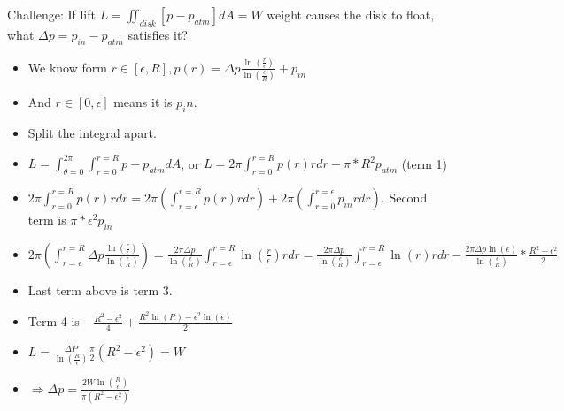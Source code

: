 \documentclass[11pt, oneside]{article}   	%
\begin{document}
Challenge: If lift $L = \iint_{disk} [p-p_{atm}]dA = W$ weight causes the disk to float, what $\Delta p = p_{in} - p_{atm}$ satisfies it?
\begin{itemize}
\item We know form $r \in [\epsilon, R], p(r) = \Delta p \frac
  {\ln(\frac{r}{\epsilon})}
  {\ln(\frac{\epsilon}{R})}+ p_{in}$ 
\item And $r \in [0, \epsilon]$ means it is $p_in$.
\item Split the integral apart. 
\item $L = \int_{\theta =  0}^{2\pi} \int_{r=0}^{r=R} p-p_{atm}dA$, or $L = 2\pi\int_{r=0}^{r=R} p(r)r dr  - \pi*R^2p_{atm}$ (term 1)
\item $2\pi\int_{r=0}^{r=R} p(r)r dr = 2\pi(\int_{r=\epsilon}^{r=R} p(r)r dr) + 2\pi(\int_{r=0}^{r=\epsilon} {p_{in}}r dr)$. Second term is $\pi * \epsilon^2 p_{in}$
\item $2\pi(\int_{r=\epsilon}^{r=R} \Delta p \frac
  {\ln(\frac{r}{\epsilon})}
  {\ln(\frac{\epsilon}{R})}) = \frac{2\pi \Delta p}{\ln(\frac{\epsilon}{R})} \int_{r=\epsilon}^{r=R} \ln(\frac{r}{\epsilon})r dr
= \frac{2\pi \Delta p}{\ln(\frac{\epsilon}{R})} \int_{r=\epsilon}^{r=R} \ln(r)r dr -  \frac{2\pi \Delta p \ln(\epsilon)}{\ln(\frac{\epsilon}{R})} *\frac{R^2-\epsilon^2}{2}$
\item Last term above is term 3.
\item Term 4 is $- \frac{R^2 - \epsilon^2}{4} + \frac{R^2\ln(R) - \epsilon^2\ln(\epsilon)}{2}$
\item $L = \frac{\Delta P}{\ln(\frac{R}{\epsilon})} \frac{\pi}{2}(R^2 -\epsilon^2) = W$
\item $\Rightarrow \Delta p = \frac{2W\ln(\frac{R}{\epsilon})}{\pi (R^2-\epsilon^2)}$
\end{itemize}
\end{document}
